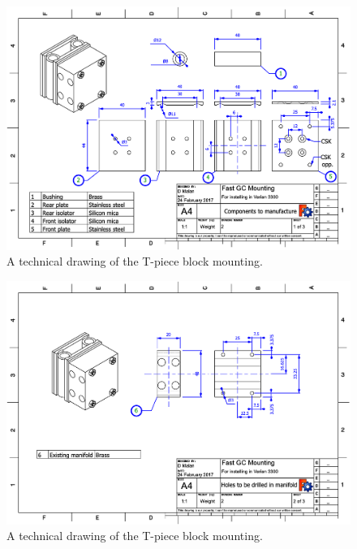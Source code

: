 \begin{figure}
	\centering
	\includegraphics[angle=90, origin=c, width=\textwidth]{Figures/CarDrawing1.pdf}
	\decoRule	
	\caption[Technical drawing of coaxial heater mounting.]{A technical drawing of the T-piece block mounting.} 
	\label{fig:CarsDrawing1}
\end{figure}

\begin{figure}
	\centering
	\includegraphics[angle=90, origin=c, width=\textwidth]{Figures/CarDrawing2.pdf}
	\decoRule	
	\caption[Technical drawing of coaxial heater mounting.]{A technical drawing of the T-piece block mounting.} 
	\label{fig:CarsDrawing2}
\end{figure}


